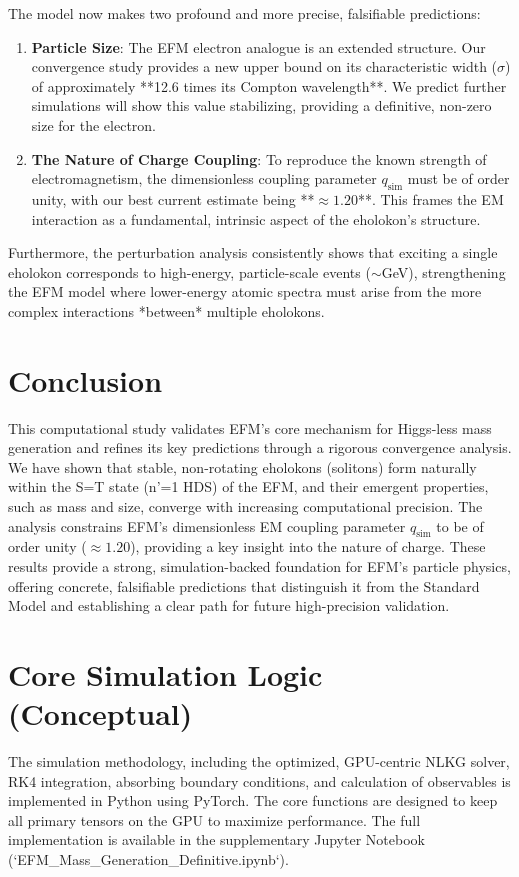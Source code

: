 \documentclass[11pt]{article}
\begin{document}
The model now makes two profound and more precise, falsifiable predictions:
\begin{enumerate}
    \item \textbf{Particle Size}: The EFM electron analogue is an extended structure. Our convergence study provides a new upper bound on its characteristic width (\(\sigma\)) of approximately **12.6 times its Compton wavelength**. We predict further simulations will show this value stabilizing, providing a definitive, non-zero size for the electron.
    \item \textbf{The Nature of Charge Coupling}: To reproduce the known strength of electromagnetism, the dimensionless coupling parameter \(q_{\text{sim}}\) must be of order unity, with our best current estimate being **\(\approx 1.20\)**. This frames the EM interaction as a fundamental, intrinsic aspect of the eholokon's structure.
\end{enumerate}
Furthermore, the perturbation analysis consistently shows that exciting a single eholokon corresponds to high-energy, particle-scale events (\(\sim\)GeV), strengthening the EFM model where lower-energy atomic spectra must arise from the more complex interactions *between* multiple eholokons.

\section{Conclusion}
This computational study validates EFM's core mechanism for Higgs-less mass generation and refines its key predictions through a rigorous convergence analysis. We have shown that stable, non-rotating eholokons (solitons) form naturally within the S=T state (n'=1 HDS) of the EFM, and their emergent properties, such as mass and size, converge with increasing computational precision. The analysis constrains EFM's dimensionless EM coupling parameter \(q_{\text{sim}}\) to be of order unity (\(\approx 1.20\)), providing a key insight into the nature of charge. These results provide a strong, simulation-backed foundation for EFM's particle physics, offering concrete, falsifiable predictions that distinguish it from the Standard Model and establishing a clear path for future high-precision validation.

\appendix
\section{Core Simulation Logic (Conceptual)}
\label{app:code_mass_gen_final}
The simulation methodology, including the optimized, GPU-centric NLKG solver, RK4 integration, absorbing boundary conditions, and calculation of observables is implemented in Python using PyTorch. The core functions are designed to keep all primary tensors on the GPU to maximize performance. The full implementation is available in the supplementary Jupyter Notebook (`EFM_Mass_Generation_Definitive.ipynb`).
\end{document}
